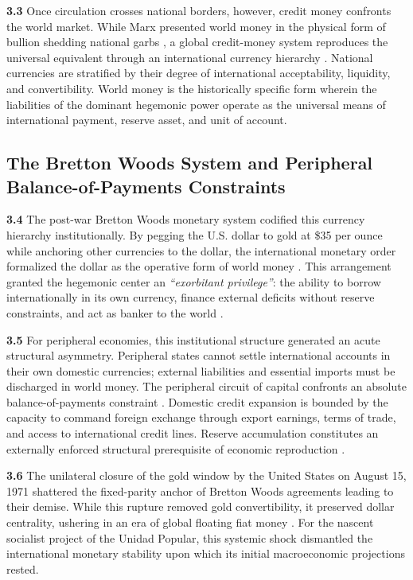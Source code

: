 \textbf{3.3} Once circulation crosses national borders, however, credit money confronts the world market. While Marx presented world money in the physical form of bullion shedding national garbs \citep[p.~51]{Ivanova2013}, a global credit-money system reproduces the universal equivalent through an international currency hierarchy \citep{Vasudevan2009,Ivanova2020}. National currencies are stratified by their degree of international acceptability, liquidity, and convertibility. World money is the historically specific form wherein the liabilities of the dominant hegemonic power operate as the universal means of international payment, reserve asset, and unit of account.

\subsection{The Bretton Woods System and Peripheral Balance-of-Payments Constraints}
\label{sec:B2_BrettonWoods_BOP}

\textbf{3.4} The post-war Bretton Woods monetary system codified this currency hierarchy institutionally. By pegging the U.S. dollar to gold at \$35 per ounce while anchoring other currencies to the dollar, the international monetary order formalized the dollar as the operative form of world money \citep[p.~483]{Vasudevan2009}. This arrangement granted the hegemonic center an \textit{``exorbitant privilege''}: the ability to borrow internationally in its own currency, finance external deficits without reserve constraints, and act as banker to the world \citep[pp.~243--244]{Vasudevan2019}.

\textbf{3.5} For peripheral economies, this institutional structure generated an acute structural asymmetry. Peripheral states cannot settle international accounts in their own domestic currencies; external liabilities and essential imports must be discharged in world money. The peripheral circuit of capital confronts an absolute balance-of-payments constraint \citep{Vasudevan2016,Abeles2013}. Domestic credit expansion is bounded by the capacity to command foreign exchange through export earnings, terms of trade, and access to international credit lines. Reserve accumulation constitutes an externally enforced structural prerequisite of economic reproduction \citep[p.~244]{Vasudevan2019}.

\textbf{3.6} The unilateral closure of the gold window by the United States on August 15, 1971 shattered the fixed-parity anchor of Bretton Woods agreements leading to their demise. While this rupture removed gold convertibility, it preserved dollar centrality, ushering in an era of global floating fiat money \citep[p.~486]{Vasudevan2009}. For the nascent socialist project of the Unidad Popular, this systemic shock dismantled the international monetary stability upon which its initial macroeconomic projections rested.

